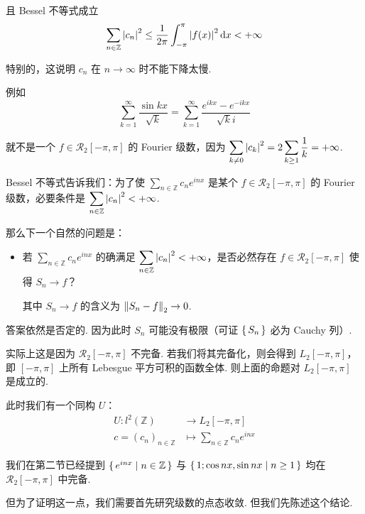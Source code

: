且 Bessel 不等式成立
$$
\sum_{n\in\mathbb{Z}}\left\lvert{c_n}\right\rvert^2\le\frac{1}{2\pi}\int_{-\pi}^{\pi}\left\lvert{f(x)}\right\rvert^2\mathrm{d} x<+\infty
$$

特别的，这说明 $c_n$ 在 $n\to\infty$ 时不能下降太慢.

例如
$$
\displaystyle\sum_{k=1}^\infty\frac{\sin kx}{\sqrt{k}}=\sum_{k=1}^\infty\frac{e^{ikx}-e^{-ikx}}{\sqrt{k}i}
$$

就不是一个 $f\in \mathcal{R}_2[-\pi,\pi]$ 的 Fourier 级数，因为 $\displaystyle\sum_{k\ne 0}\left\lvert{c_k}\right\rvert^2=2\sum_{k\ge 1}\frac{1}{k}=+\infty$.

Bessel 不等式告诉我们：为了使 $\displaystyle\sum_{n\in\mathbb{Z}}c_ne^{inx}$ 是某个 $f\in \mathcal{R}_2[-\pi,\pi]$ 的 Fourier 级数，必要条件是 $\displaystyle\sum_{n\in\mathbb{Z}}\left\lvert{c_n}\right\rvert^2<+\infty$.

那么下一个自然的问题是：

\begin{itemize}
    \item 若 $\displaystyle\sum_{n\in\mathbb{Z}}c_ne^{inx}$ 的确满足 $\displaystyle\sum_{n\in\mathbb{Z}}\left\lvert{c_n}\right\rvert^2<+\infty$，是否必然存在 $f\in \mathcal{R}_2[-\pi,\pi]$ 使得 $S_n\to f$？
    
    其中 $S_n\to f$ 的含义为 $\left\lVert{S_n-f}\right\rVert_2\to 0$.
\end{itemize}

答案依然是否定的. 因为此时 $S_n$ 可能没有极限（可证 $\set{S_n}$ 必为 Cauchy 列）.

实际上这是因为 $\mathcal{R}_2[-\pi,\pi]$ 不完备. 若我们将其完备化，则会得到 $L_2[-\pi,\pi]$，即 $[-\pi,\pi]$ 上所有 Lebesgue 平方可积的函数全体. 则上面的命题对 $L_2[-\pi,\pi]$ 是成立的.

此时我们有一个同构 $U$：
$$
\begin{aligned}
    U:l^2(\mathbb{Z})&\to L_2[-\pi,\pi]\\
    c=(c_n)_{n\in\mathbb{Z}}&\mapsto\sum_{n\in\mathbb{Z}}c_ne^{inx}
\end{aligned}
$$


我们在第二节已经提到 $\set{e^{inx}|n\in\mathbb{Z}}$ 与 $\set{1;\cos nx,\sin nx|n\ge 1}$ 均在 $\mathcal{R}_2[-\pi,\pi]$ 中完备.

但为了证明这一点，我们需要首先研究级数的点态收敛. 但我们先陈述这个结论.

